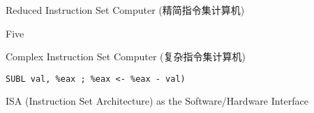 

\begin{frame}{}
  \begin{center}
     Reduced Instruction Set Computer (精简指令集计算机)

    \vspace{0.80cm}
    \vspace{0.80cm}

     Five
  \end{center}
\end{frame}

\begin{frame}{}
  \begin{center}
     Complex Instruction Set Computer (复杂指令集计算机)

    \vspace{0.30cm}
    \vspace{0.30cm}

  \end{center}
\end{frame}

\begin{frame}{}
  \begin{center}
     \texttt{SUBL val, \%eax ; \%eax <- \%eax - val)}

    \vspace{0.30cm}
    \vspace{0.30cm}
  \end{center}
\end{frame}

\begin{frame}{}
  \begin{center}
    ISA (Instruction Set Architecture) as the Software/Hardware Interface
  \end{center}
\end{frame}

